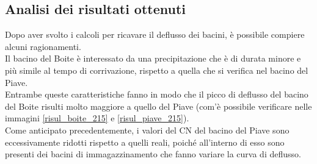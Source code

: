 \subsection{Analisi dei risultati ottenuti}
Dopo aver svolto i calcoli per ricavare il deflusso dei bacini, è possibile compiere alcuni ragionamenti.\\
Il bacino del Boite è interessato da una precipitazione che è di durata minore e più simile al tempo di corrivazione, rispetto a quella che si verifica nel bacino del Piave.\\
Entrambe queste caratteristiche fanno in modo che il picco di deflusso del bacino del Boite risulti molto maggiore a quello del Piave (com'è possibile verificare nelle immagini \ref{risul_boite_215} e \ref{risul_piave_215}).\\
Come anticipato precedentemente, i valori del CN del bacino del Piave sono eccessivamente ridotti rispetto a quelli reali, poiché all'interno di esso sono presenti dei bacini di immagazzinamento che fanno variare la curva di deflusso.